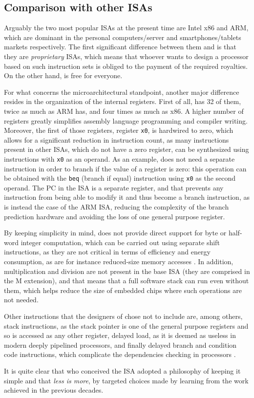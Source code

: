 \subsection{Comparison with other \acsp{ISA}}\label{sec:isas}
Arguably the two most popular \acp{ISA} at the present time are Intel x86 and ARM, which are dominant in the personal computers/server and smartphones/tablets markets respectively. The first significant difference between them and \riscv is that they are \emph{proprietary} \acp{ISA}, which means that whoever wants to design a processor based on such instruction sets is obliged to the payment of the required royalties. On the other hand, \riscv is free for everyone.

For what concerns the microarchitectural standpoint, another major difference resides in the organization of the internal registers. First of all, \riscv has 32 of them, twice as much as ARM has, and four times as much as x86. A higher number of registers greatly simplifies assembly language programming and compiler writing. Moreover, the first of those registers, register \texttt{x0}, is hardwired to zero, which allows for a significant reduction in instruction count, as many instructions present in other \acp{ISA}, which do not have a zero register, can be synthesized using \riscv instructions with \texttt{x0} as an operand. As an example, \riscv does not need a separate instruction in order to branch if the value of a register is zero: this operation can be obtained with the \texttt{beq} (branch if equal) instruction using \texttt{x0} as the second operand. The \ac{PC} in the \riscv \ac{ISA} is a separate register, and that prevents any instruction from being able to modify it and thus become a branch instruction, as is instead the case of the ARM \ac{ISA}, reducing the complexity of the branch prediction hardware and avoiding the loss of one general purpose register.

By keeping simplicity in mind, \riscv does not provide direct support for byte or half-word integer computation, which can be carried out using separate shift instructions, as they are not critical in terms of efficiency and energy consumption, as are for instance reduced-size memory accesses \cite[p.~20]{reader}. In addition, multiplication and division are not present in the base \ac{ISA} (they are comprised in the M extension), and that means that a full software stack can run even without them, which helps reduce the size of embedded chips where such operations are not needed.

Other instructions that the designers of \riscv chose not to include are, among others, stack instructions, as the stack pointer is one of the general purpose registers and so is accessed as any other register, delayed load, as it is deemed as useless in modern deeply pipelined processors, and finally delayed branch and condition code instructions, which complicate the dependencies checking in \ooo processors \cite[p.~21]{reader}.

It is quite clear that who conceived the \riscv \ac{ISA} adopted a philosophy of keeping it simple and that \emph{less is more}, by targeted choices made by learning from the work achieved in the previous decades.